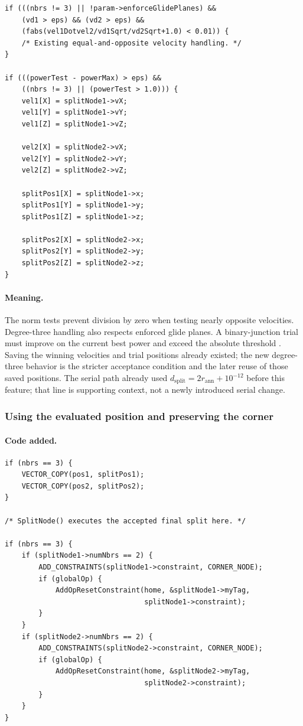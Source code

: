 \documentclass[11pt]{article}
\newcommand{\code}[1]{\texttt{\detokenize{#1}}}
\begin{document}
\begin{lstlisting}[style=cpp]
if (((nbrs != 3) || !param->enforceGlidePlanes) &&
    (vd1 > eps) && (vd2 > eps) &&
    (fabs(vel1Dotvel2/vd1Sqrt/vd2Sqrt+1.0) < 0.01)) {
    /* Existing equal-and-opposite velocity handling. */
}

if (((powerTest - powerMax) > eps) &&
    ((nbrs != 3) || (powerTest > 1.0))) {
    vel1[X] = splitNode1->vX;
    vel1[Y] = splitNode1->vY;
    vel1[Z] = splitNode1->vZ;

    vel2[X] = splitNode2->vX;
    vel2[Y] = splitNode2->vY;
    vel2[Z] = splitNode2->vZ;

    splitPos1[X] = splitNode1->x;
    splitPos1[Y] = splitNode1->y;
    splitPos1[Z] = splitNode1->z;

    splitPos2[X] = splitNode2->x;
    splitPos2[Y] = splitNode2->y;
    splitPos2[Z] = splitNode2->z;
}
\end{lstlisting}

\paragraph{Meaning.}
The norm tests prevent division by zero when testing nearly opposite
velocities.  Degree-three handling also respects enforced glide planes.  A
binary-junction trial must improve on the current best power and exceed the
absolute threshold \code{powerTest > 1.0}.  Saving the winning velocities and
trial positions already existed; the new degree-three behavior is the stricter
acceptance condition and the later reuse of those saved positions.  The serial
path already used
$d_{\mathrm{split}}=2r_{\mathrm{ann}}+10^{-12}$ before this feature; that line
is supporting context, not a newly introduced serial change.

\subsubsection{Using the evaluated position and preserving the corner}

\paragraph{Code added.}

\begin{lstlisting}[style=cpp]
if (nbrs == 3) {
    VECTOR_COPY(pos1, splitPos1);
    VECTOR_COPY(pos2, splitPos2);
}

/* SplitNode() executes the accepted final split here. */

if (nbrs == 3) {
    if (splitNode1->numNbrs == 2) {
        ADD_CONSTRAINTS(splitNode1->constraint, CORNER_NODE);
        if (globalOp) {
            AddOpResetConstraint(home, &splitNode1->myTag,
                                 splitNode1->constraint);
        }
    }
    if (splitNode2->numNbrs == 2) {
        ADD_CONSTRAINTS(splitNode2->constraint, CORNER_NODE);
        if (globalOp) {
            AddOpResetConstraint(home, &splitNode2->myTag,
                                 splitNode2->constraint);
        }
    }
}
\end{lstlisting}
\end{document}
